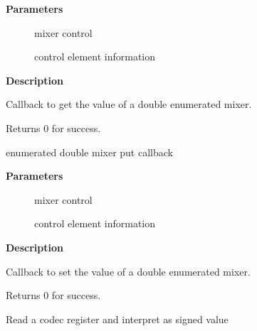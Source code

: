 \documentclass[a4paper,8pt,english]{sphinxmanual}
\begin{document}
\textbf{Parameters}
\begin{description}
\item[{}] \leavevmode
mixer control

\item[{}] \leavevmode
control element information

\end{description}

\textbf{Description}

Callback to get the value of a double enumerated mixer.

Returns 0 for success.

\begin{fulllineitems}
\label{sound/kernel-api/alsa-driver-api:c.snd_soc_put_enum_double}
enumerated double mixer put callback

\end{fulllineitems}


\textbf{Parameters}
\begin{description}
\item[{}] \leavevmode
mixer control

\item[{}] \leavevmode
control element information

\end{description}

\textbf{Description}

Callback to set the value of a double enumerated mixer.

Returns 0 for success.

\begin{fulllineitems}
\label{sound/kernel-api/alsa-driver-api:c.snd_soc_read_signed}
Read a codec register and interpret as signed value

\end{fulllineitems}
\end{document}
